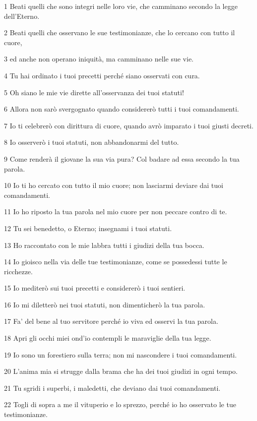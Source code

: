 \par 1 Beati quelli che sono integri nelle loro vie, che camminano secondo la legge dell'Eterno.
\par 2 Beati quelli che osservano le sue testimonianze, che lo cercano con tutto il cuore,
\par 3 ed anche non operano iniquità, ma camminano nelle sue vie.
\par 4 Tu hai ordinato i tuoi precetti perché siano osservati con cura.
\par 5 Oh siano le mie vie dirette all'osservanza dei tuoi statuti!
\par 6 Allora non sarò svergognato quando considererò tutti i tuoi comandamenti.
\par 7 Io ti celebrerò con dirittura di cuore, quando avrò imparato i tuoi giusti decreti.
\par 8 Io osserverò i tuoi statuti, non abbandonarmi del tutto.
\par 9 Come renderà il giovane la sua via pura? Col badare ad essa secondo la tua parola.
\par 10 Io ti ho cercato con tutto il mio cuore; non lasciarmi deviare dai tuoi comandamenti.
\par 11 Io ho riposto la tua parola nel mio cuore per non peccare contro di te.
\par 12 Tu sei benedetto, o Eterno; insegnami i tuoi statuti.
\par 13 Ho raccontato con le mie labbra tutti i giudizi della tua bocca.
\par 14 Io gioisco nella via delle tue testimonianze, come se possedessi tutte le ricchezze.
\par 15 Io mediterò sui tuoi precetti e considererò i tuoi sentieri.
\par 16 Io mi diletterò nei tuoi statuti, non dimenticherò la tua parola.
\par 17 Fa' del bene al tuo servitore perché io viva ed osservi la tua parola.
\par 18 Apri gli occhi miei ond'io contempli le maraviglie della tua legge.
\par 19 Io sono un forestiero sulla terra; non mi nascondere i tuoi comandamenti.
\par 20 L'anima mia si strugge dalla brama che ha dei tuoi giudizi in ogni tempo.
\par 21 Tu sgridi i superbi, i maledetti, che deviano dai tuoi comandamenti.
\par 22 Togli di sopra a me il vituperio e lo sprezzo, perché io ho osservato le tue testimonianze.
